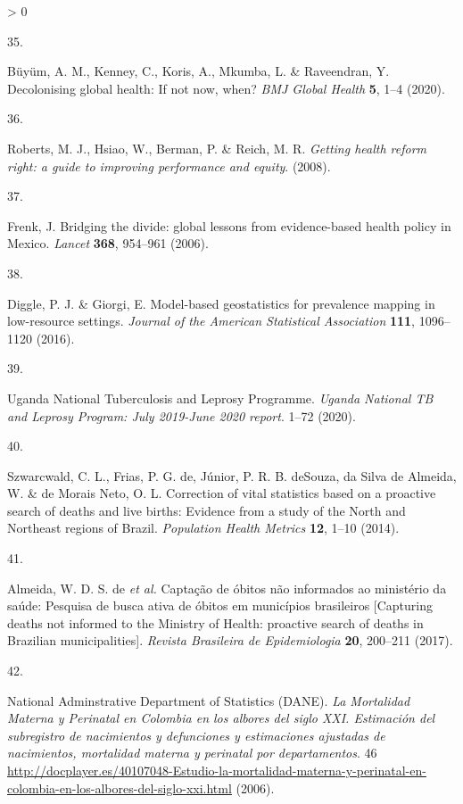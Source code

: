 \documentclass[
]{article}
\newlength{\cslhangindent}
\newlength{\csllabelwidth}
\newenvironment{CSLReferences}[2] %
 {%
  \setlength{\parindent}{0pt}
  \ifodd #1 \everypar{\setlength{\hangindent}{\cslhangindent}}\ignorespaces\fi
  \ifnum #2 > 0
  \setlength{\parskip}{#2\baselineskip}
  \fi
 }%
 {}
\newcommand{\CSLLeftMargin}[1]{\parbox[t]{\csllabelwidth}{#1}}
\newcommand{\CSLRightInline}[1]{\parbox[t]{\linewidth - \csllabelwidth}{#1}\break}
\begin{document}
\begin{CSLReferences}{0}{0}
\leavevmode\hypertarget{ref-Buyum2020}{}%
\CSLLeftMargin{35. }
\CSLRightInline{Büyüm, A. M., Kenney, C., Koris, A., Mkumba, L. \& Raveendran, Y. {Decolonising global health: If not now, when?} \emph{BMJ Global Health} \textbf{5}, 1--4 (2020).}

\leavevmode\hypertarget{ref-Roberts2008}{}%
\CSLLeftMargin{36. }
\CSLRightInline{Roberts, M. J., Hsiao, W., Berman, P. \& Reich, M. R. \emph{{Getting health reform right: a guide to improving performance and equity}}. (2008).}

\leavevmode\hypertarget{ref-Frenk2006}{}%
\CSLLeftMargin{37. }
\CSLRightInline{Frenk, J. {Bridging the divide: global lessons from evidence-based health policy in Mexico}. \emph{Lancet} \textbf{368}, 954--961 (2006).}

\leavevmode\hypertarget{ref-Diggle2016}{}%
\CSLLeftMargin{38. }
\CSLRightInline{Diggle, P. J. \& Giorgi, E. {Model-based geostatistics for prevalence mapping in low-resource settings}. \emph{Journal of the American Statistical Association} \textbf{111}, 1096--1120 (2016).}

\leavevmode\hypertarget{ref-UgandaNationalTuberculosisandLeprosyProgramme2020}{}%
\CSLLeftMargin{39. }
\CSLRightInline{Uganda National Tuberculosis and Leprosy Programme. \emph{{Uganda National TB and Leprosy Program: July 2019-June 2020 report}}. 1--72 (2020).}

\leavevmode\hypertarget{ref-Szwarcwald2014}{}%
\CSLLeftMargin{40. }
\CSLRightInline{Szwarcwald, C. L., Frias, P. G. de, Júnior, P. R. B. deSouza, da Silva de Almeida, W. \& de Morais Neto, O. L. {Correction of vital statistics based on a proactive search of deaths and live births: Evidence from a study of the North and Northeast regions of Brazil}. \emph{Population Health Metrics} \textbf{12}, 1--10 (2014).}

\leavevmode\hypertarget{ref-DeAlmeida2017a}{}%
\CSLLeftMargin{41. }
\CSLRightInline{Almeida, W. D. S. de \emph{et al.} {Capta{ç}{ã}o de {ó}bitos n{ã}o informados ao minist{é}rio da sa{ú}de: Pesquisa de busca ativa de {ó}bitos em munic{í}pios brasileiros {[}Capturing deaths not informed to the Ministry of Health: proactive search of deaths in Brazilian municipalities{]}}. \emph{Revista Brasileira de Epidemiologia} \textbf{20}, 200--211 (2017).}

\leavevmode\hypertarget{ref-NationalAdminstrativeDepartmentofStatisticsDANE2006}{}%
\CSLLeftMargin{42. }
\CSLRightInline{National Adminstrative Department of Statistics (DANE). \emph{{La Mortalidad Materna y Perinatal en Colombia en los albores del siglo XXI. Estimaci{ó}n del subregistro de nacimientos y defunciones y estimaciones ajustadas de nacimientos, mortalidad materna y perinatal por departamentos}}. 46 \url{http://docplayer.es/40107048-Estudio-la-mortalidad-materna-y-perinatal-en-colombia-en-los-albores-del-siglo-xxi.html} (2006).}


\end{CSLReferences}
\end{document}
